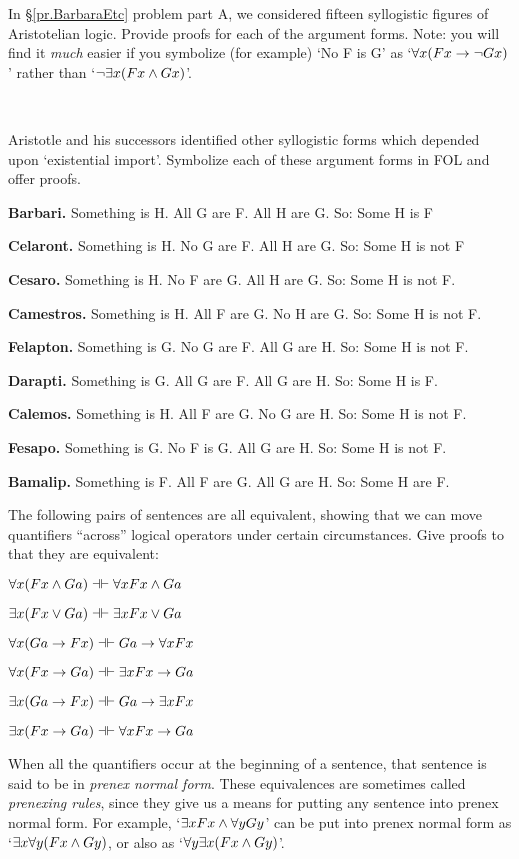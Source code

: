 \problempart
\label{pr.BarbaraEtc.proof1}
In \S\ref{pr.BarbaraEtc} problem part A, we considered fifteen syllogistic figures of Aristotelian logic. Provide proofs for each of the argument forms. Note: you will find it \emph{much} easier if you symbolize (for example) `No F is G' as `$\forall x (Fx \rightarrow \neg Gx)$' rather than `$\neg \exists x(Fx \wedge Gx)$'.

\

\problempart
\label{pr.BarbaraEtc.proof2}
Aristotle and his successors identified other syllogistic forms which depended upon `existential import'. Symbolize each of these argument forms in FOL and offer proofs.
\begin{ebullet}
	\item \textbf{Barbari.} Something is H. All G are F. All H are G. So: Some H is F
	\item \textbf{Celaront.} Something is H. No G are F. All H are G. So: Some H is not F
	\item \textbf{Cesaro.} Something is H. No F are G. All H are G. So: Some H is not F.
	\item \textbf{Camestros.} Something is H. All F are G. No H are G. So: Some H is not F.
	\item \textbf{Felapton.} Something is G. No G are F. All G are H. So: Some H is not F.
	\item \textbf{Darapti.} Something is G. All G are F. All G are H. So: Some H is F.
	\item \textbf{Calemos.} Something is H. All F are G. No G are H. So: Some H is not F.
	\item \textbf{Fesapo.} Something is G. No F is G. All G are H. So: Some H is not F.
	\item \textbf{Bamalip.} Something is F. All F are G. All G are H. So: Some H are F.
\end{ebullet}



\problempart
The following pairs of sentences are all equivalent, showing that we can move quantifiers ``across'' logical operators under certain circumstances.  Give proofs to that they are equivalent:
\begin{earg}
\item $\forall x (Fx \eand Ga) \pequiv  \forall x Fx \eand Ga$
\item $\exists x (Fx \eor Ga) \pequiv \exists x Fx \eor Ga$
\item $\forall x(Ga \eif Fx) \pequiv Ga \eif \forall x Fx$
\item $\forall x(Fx \eif Ga) \pequiv \exists x Fx \eif Ga$
\item $\exists x(Ga \eif Fx) \pequiv Ga \eif \exists x Fx$
\item $\exists x(Fx \eif Ga) \pequiv \forall x Fx \eif Ga$
\end{earg}
When all the quantifiers occur at the beginning of a sentence, that sentence is said to be in \emph{prenex normal form}. These equivalences are sometimes called \emph{prenexing rules}, since they give us a means for putting any sentence into prenex normal form. For example, `$\exists x Fx \wedge \forall yGy$' can be put into prenex normal form as `$\exists x\forall y(Fx \wedge Gy)$, or also as `$\forall y \exists x(Fx \wedge Gy)$'.

